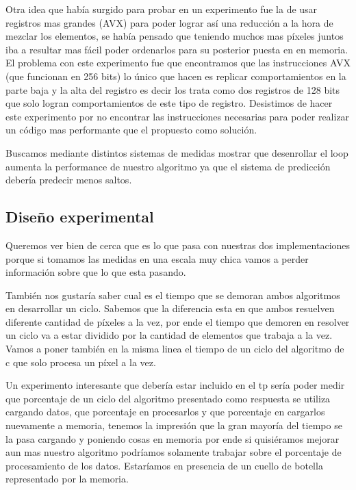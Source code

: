 Otra idea que había surgido para probar en un experimento fue la de usar registros mas grandes (AVX) para poder lograr así una reducción a la hora de mezclar los elementos, se había pensado que teniendo muchos mas píxeles juntos iba a resultar mas fácil poder ordenarlos para su posterior puesta en en memoria. El problema con este experimento fue que encontramos que las instrucciones AVX (que funcionan en 256 bits) lo único que hacen es replicar comportamientos en la parte baja y la alta del registro es decir los trata como dos registros de 128 bits que solo logran comportamientos de este tipo de registro. Desistimos de hacer este experimento por no encontrar las instrucciones necesarias para poder realizar un código mas performante que el propuesto como solución.

Buscamos mediante distintos sistemas de medidas mostrar que desenrollar el loop aumenta la performance de nuestro algoritmo ya que el sistema de predicción debería predecir menos saltos.

\subsection{Diseño experimental}

Queremos ver bien de cerca que es lo que pasa con nuestras dos implementaciones porque si tomamos las medidas en una escala muy chica vamos a perder información sobre que lo que esta pasando. 

También nos gustaría saber cual es el tiempo que se demoran ambos algoritmos en desarrollar un ciclo. Sabemos que la diferencia esta en que ambos resuelven diferente cantidad de  píxeles a la vez, por ende el tiempo que demoren en resolver un ciclo va a estar dividido por la cantidad de elementos que trabaja a la vez. Vamos a poner también en la misma linea el tiempo de un ciclo del algoritmo de c que solo procesa un píxel a la vez.

Un experimento interesante que debería estar incluido en el tp sería poder medir que porcentaje de un ciclo del algoritmo presentado como respuesta se utiliza cargando datos, que porcentaje en procesarlos y que porcentaje en cargarlos nuevamente a memoria, tenemos la impresión que la gran mayoría del tiempo se la pasa cargando y poniendo cosas en memoria por ende si quisiéramos mejorar aun mas nuestro algoritmo podríamos solamente trabajar sobre el porcentaje de procesamiento de los datos. Estaríamos en presencia de un cuello de botella representado por la memoria.

